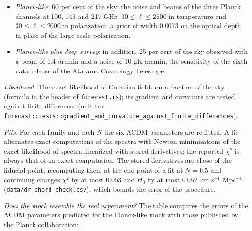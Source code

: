 \documentclass[
  10pt,
]{article}
\providecommand{\tightlist}{%
  \setlength{\itemsep}{0pt}\setlength{\parskip}{0pt}}
\begin{document}
\begin{itemize}
\tightlist
\item
  \emph{Planck-like}: 60 per cent of the sky; the noise and beams of the
  three Planck channels at 100, 143 and 217 GHz; \(30\le\ell\le2500\) in
  temperature and \(30\le\ell\le2000\) in polarization; a prior of width
  0.0073 on the optical depth in place of the large-scale polarization.
\item
  \emph{Planck-like plus deep survey}: in addition, 25 per cent of the
  sky observed with a beam of 1.4 arcmin and a noise of 10 μK arcmin,
  the sensitivity of the sixth data release of the Atacama Cosmology
  Telescope.
\end{itemize}

\emph{Likelihood.} The exact likelihood of Gaussian fields on a fraction
of the sky (formula in the header of \texttt{forecast.rs}); its gradient
and curvature are tested against finite differences (unit test
\texttt{forecast::tests::gradient\_and\_curvature\_against\_finite\_differences}).

\emph{Fits.} For each family and each \(N\) the six ΛCDM parameters are
re-fitted. A fit alternates exact computations of the spectra with
Newton minimizations of the exact likelihood of spectra linearized with
stored derivatives; the reported \(\chi^2\) is always that of an exact
computation. The stored derivatives are those of the fiducial point;
recomputing them at the end point of a fit at \(N=0.5\) and continuing
changes \(\chi^2\) by at most 0.053 and \(H_0\) by at most 0.052 km
s\(^{-1}\) Mpc\(^{-1}\) (\texttt{data/dr\_chord\_check.csv}), which
bounds the error of the procedure.

\emph{Does the mock resemble the real experiment?} The table compares
the errors of the ΛCDM parameters predicted for the Planck-like mock
with those published by the Planck collaboration:
\end{document}
